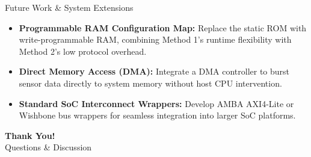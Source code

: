 \documentclass{beamer}
\begin{document}
\begin{frame}{Future Work \& System Extensions}
  \begin{itemize}
    \item \textbf{Programmable RAM Configuration Map:} Replace the static ROM with write-programmable RAM, combining Method 1's runtime flexibility with Method 2's low protocol overhead.
    \item \textbf{Direct Memory Access (DMA):} Integrate a DMA controller to burst sensor data directly to system memory without host CPU intervention.
    \item \textbf{Standard SoC Interconnect Wrappers:} Develop AMBA AXI4-Lite or Wishbone bus wrappers for seamless integration into larger SoC platforms.
  \end{itemize}
\end{frame}

\begin{frame}
  \centering
  \Huge \textbf{Thank You!} \\
  \vspace{0.5cm}
  \Large Questions \& Discussion
\end{frame}
\end{document}
